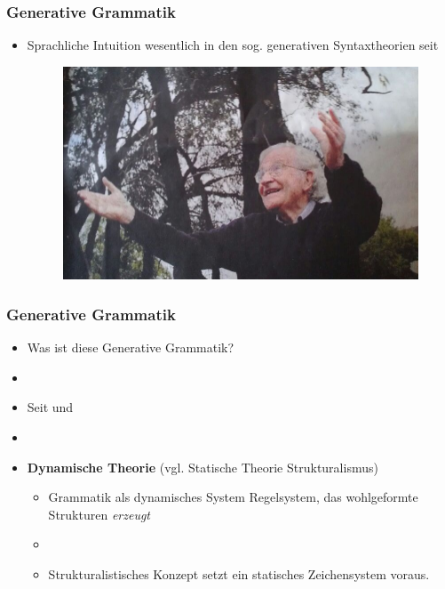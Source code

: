 \begin{frame}
\frametitle{Generative Grammatik}

\begin{itemize}

	\item Sprachliche Intuition \ras wesentlich in den sog. generativen Syntaxtheorien seit \citet{Chomsky57a}

\begin{figure}
\centering
	\includegraphics[scale=.3]{material/04chomsky}
\end{figure}

	
\end{itemize}

\end{frame}


\begin{frame}
\frametitle{Generative Grammatik}

\begin{itemize}
	\item Was ist diese Generative Grammatik?
	\item[]
	\item Seit \citet{Chomsky57a} und \citet{Chomsky65a}
	\item[]
	\item \textbf{Dynamische Theorie} (vgl. Statische Theorie \ras \zB Strukturalismus)
	\begin{itemize}
		\item Grammatik als dynamisches System \ras Regelsystem, das wohlgeformte Strukturen \emph{erzeugt}
		\item[]
		\item Strukturalistisches Konzept  setzt ein statisches Zeichensystem voraus. 
	\end{itemize}

\end{itemize}

\end{frame}


